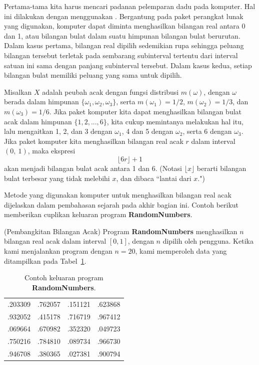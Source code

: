 Pertama-tama kita harus mencari padanan pelemparan dadu pada komputer.  Hal ini dilakukan
dengan menggunakan .
Bergantung pada paket perangkat lunak yang digunakan,
komputer dapat diminta menghasilkan bilangan real antara 0 dan 1, atau bilangan bulat dalam suatu
himpunan bilangan bulat berurutan.  Dalam kasus pertama, bilangan real dipilih sedemikian rupa sehingga
peluang bilangan tersebut terletak pada sembarang subinterval tertentu dari interval satuan ini
sama dengan panjang subinterval tersebut.  Dalam kasus kedua, setiap bilangan bulat memiliki
peluang yang sama untuk dipilih.
\par
Misalkan $X$ adalah peubah acak dengan fungsi distribusi $m(\omega)$, dengan $\omega$ berada dalam himpunan $\{\omega_1,
\omega_2, \omega_3\}$, serta $m(\omega_1) = 1/2$, $m(\omega_2) = 1/3$, dan $m(\omega_3) = 1/6$.  Jika
paket komputer kita dapat menghasilkan bilangan bulat acak dalam himpunan $\{1, 2, ..., 6\}$, kita cukup memintanya
melakukan hal itu, lalu mengaitkan 1, 2, dan 3 dengan $\omega_1$, 4 dan 5 dengan $\omega_2$, serta 6
dengan $\omega_3$.  Jika paket komputer kita menghasilkan bilangan real acak $r$ dalam interval
$(0,~1)$, maka ekspresi
$$\lfloor {6r}\rfloor + 1$$
akan menjadi bilangan bulat acak antara 1 dan 6.  (Notasi $\lfloor x \rfloor$ berarti bilangan bulat terbesar
yang tidak melebihi $x$, dan dibaca ``lantai dari $x$.")
\par
Metode yang digunakan komputer untuk menghasilkan bilangan real acak dijelaskan dalam pembahasan
sejarah pada akhir bagian ini.  Contoh berikut memberikan cuplikan keluaran program {\bf
RandomNumbers}.
\begin{example}(Pembangkitan Bilangan Acak) \label{exam 1.05}
Program {\bf RandomNumbers} menghasilkan $n$ bilangan real acak dalam interval $[0, 1]$, dengan
$n$ dipilih oleh pengguna.  Ketika kami menjalankan program dengan $n = 20$, kami memperoleh data yang ditampilkan pada
Tabel~\ref{table 1.1}.
\begin{table}
\centering
\begin{tabular}{llll} 
.203309 &
.762057 &
.151121 &
.623868 \\
.932052 &
.415178 &
.716719 &
.967412 \\
.069664 & 
.670982 &
.352320 &
.049723 \\
.750216 &
.784810 &
.089734 &
.966730 \\
.946708 &
.380365 &
.027381 &
.900794 \\
\end{tabular}
\caption{Contoh keluaran program {\bf RandomNumbers}.}
\label{table 1.1}
\end{table}
\end{example}

